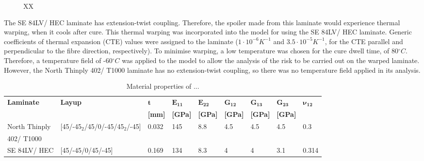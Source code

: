 \documentclass{IEEEtran}
\begin{document}
    \begin{figure}[!h]
        \footnotesize
        \centering
        
        \caption{ XX }
        \label{fig:Imperfect}
    \end{figure}
    \normalfont

    The SE 84LV/ HEC laminate has extension-twist coupling. Therefore, the spoiler made from this laminate would experience thermal warping, when it cools after cure. This thermal warping was incorporated into the model for using the SE 84LV/ HEC laminate. Generic coefficients of thermal expansion (CTE) values were assigned to the laminate ($1\cdot10^{-6}K^{-1}$ and $3.5\cdot10^{-5}K^{-1}$, for the CTE parallel and perpendicular to the fibre direction, respectively). To minimise warping, a low temperature was chosen for the cure dwell time, of 80\;$^\circ C$. Therefore, a temperature field of -60\;$^\circ C$ was applied to the model to allow the analysis of the risk to be carried out on the warped laminate. However, the North Thinply 402/ T1000 laminate has no extension-twist coupling, so there was no temperature field applied in its analysis. 


    \begin{table}[]
    \centering
    \small
     \caption{ Material properties of ... }
     \label{tab:ModelProp}
    \begin{tabular}{|l|l|l|l|l|l|l|l|l|}
    \hline
    \textbf{Laminate}   &  \textbf{Layup}   & $\mathbf{t}$ & $\mathbf{E_{11}}$ & $\mathbf{E_{22}}$ & $\mathbf{G_{12}}$ & $\mathbf{G_{13}}$ & $\mathbf{G_{23}}$ & $\mathbf{\nu_{12}}$ \\ 
    && \textbf{{[}mm{]}} & \textbf{{[}GPa{]}} & \textbf{{[}GPa{]}} & \textbf{{[}GPa{]}} & \textbf{{[}GPa{]}} & \textbf{{[}GPa{]}} &  \\ 
    \hline
    North Thinply  & [45/-45$_{2}$/45/0/-45/45$_{2}$/-45] & 0.032               & 145                   & 8.8                   & 4.5                    & 4.5                    & 4.5                    & 0.3          \\ 
     402/ T1000 &&                &                    &                   &                  &                    &                   &          \\ 
    \hline
    SE 84LV/ HEC            & [45/-45/0/45/-45] & 0.169               & 134                   & 8.3                   & 4                      & 4                      & 3.1                    & 0.314        \\ \hline
    \end{tabular}
    \end{table}
    \normalfont
\end{document}
